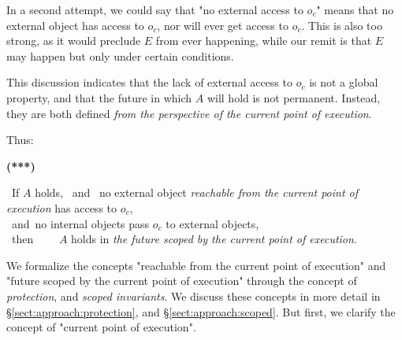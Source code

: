In a second attempt, we could say that "no external access to  $o_c$" means that no external object has access to $o_c$, nor will ever get access to $o_c$. This is also too strong, as it would preclude $E$ from ever happening, while our remit is that $E$ may happen but only under certain conditions. 

This discussion indicates that the lack of external access to $o_c$ is not a global property, and that the future in which  $A$ will hold is not permanent. 
Instead, they are both defined \emph{from the perspective of the current point of execution}.

Thus:


\vspace{.1cm}

  \begin{minipage}{.05\textwidth}
   \textbf{(***)}
\end{minipage}
\hfill
\begin{minipage}{.95\textwidth}
\begin{flushleft}
\ If $A$ holds, \  and \  no external object  \emph{reachable from the current point of execution}  has access to $o_c$, \\  
\   and\   no  internal objects pass $o_c$ to external objects,  \\
\ then \ \ \  \ $A$ holds in  \emph{the future scoped by the current point of execution}.  
\end{flushleft}
\end{minipage}

\vspace{.2cm}
 
\noindent 
We formalize the concepts "reachable from the current point of execution" and  "future scoped by the current point of execution"
through the concept of \emph{protection}, and \emph{scoped invariants}. 
We discuss these concepts in more detail in \S \ref{sect:approach:protection}, and \S \ref{sect:approach:scoped}.
But first, we clarify the concept of "current point of execution".

